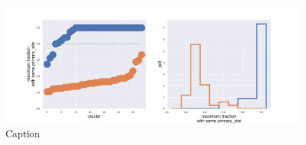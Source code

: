 \begin{figure}[htb!]
    \centering
    \includegraphics[width=0.9\linewidth]{pictures/topic/gtex/oversigma_10tissue/shuffledcluster_maximum_l2_primary_site.pdf}
    \caption{Caption}
    \label{fig:gtex/oversigma_10tissue/shuffledcluster_maximum_l2_primary_site}
\end{figure}

